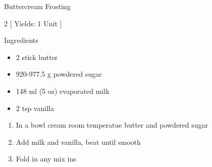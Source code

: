 \begin{Large}
    Buttercream Frosting
\end{Large}

\begin{scriptsize}
\begin{multicols}{2}
[
\vspace{1em}
Yields: 1 Unit
\vspace{-1.5em}
]

Ingredients
\begin{itemize}
    \item 2 stick butter
    \item 920-977.5 g powdered sugar
    \item 148 ml (5 oz) evaporated milk
    \item 2 tsp vanilla
\end{itemize}
\end{multicols}
\end{scriptsize}

\begin{footnotesize}
\begin{enumerate}
    \item In a bowl cream room temperatue butter and powdered sugar
    \item Add milk and vanilla, beat until smooth
    \item Fold in any mix ins
\end{enumerate}
\end{footnotesize}

\vspace{2em}
